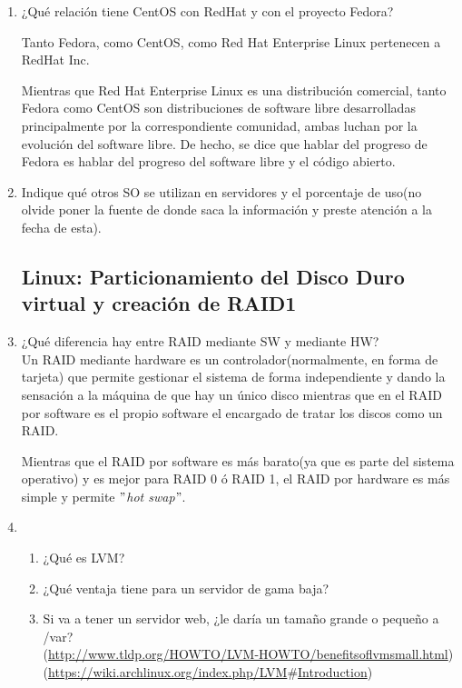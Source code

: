 \documentclass[paper=a4, fontsize=11pt]{scrartcl} %
\numberwithin{equation}{section} %
\numberwithin{figure}{section} %
\numberwithin{table}{section} %
\begin{document}
\begin{enumerate}
		\item ¿Qué relación tiene CentOS con RedHat y con el proyecto Fedora?
		
		Tanto Fedora\cite{Fedora}, como CentOS\cite{CentOS}, como Red Hat Enterprise Linux\cite{RedHat}
		pertenecen a RedHat Inc.
		
		Mientras que Red Hat Enterprise Linux es una distribución comercial, tanto Fedora como CentOS
		son distribuciones de software libre desarrolladas principalmente por la correspondiente
		comunidad, ambas luchan por la evolución del software libre. De hecho, se dice que hablar del
		progreso de Fedora es hablar del progreso del software libre y el código abierto\cite{cita}.
		
		
		\item Indique qué otros SO se utilizan en servidores y el porcentaje de uso(no olvide poner
		la fuente de donde saca la información y preste atención a la fecha de esta).
		
	\subsection{Linux: Particionamiento del Disco Duro virtual y creación de RAID1}
		\item ¿Qué diferencia hay entre RAID mediante SW y mediante HW?\\
		Un RAID mediante hardware es un controlador(normalmente, en forma de tarjeta) que permite gestionar
		el sistema de forma independiente y dando la sensación a la máquina de que hay un único disco mientras
		que en el RAID por software es el propio software el encargado de tratar los discos como un RAID.
		
		Mientras que el RAID por software es más barato(ya que es parte del sistema operativo) y es mejor
		para RAID 0 ó RAID 1, el RAID por hardware es más simple y permite \textit{$"$hot swap$"$}.
		\cite{HWvsSW}\cite{RAID_RedHat}
		
		
		\item \begin{enumerate}
			\item ¿Qué es LVM?
			
			\item ¿Qué ventaja tiene para un servidor de gama baja?
			
			\item Si va a tener un servidor web, ¿le daría un tamaño grande o pequeño a /var?\\
			(\href{http://www.tldp.org/HOWTO/LVM-HOWTO/benefitsoflvmsmall.html}
			{http://www.tldp.org/HOWTO/LVM-HOWTO/benefitsoflvmsmall.html})
			(\href{https://wiki.archlinux.org/index.php/LVM#Introduction}
			{https://wiki.archlinux.org/index.php/LVM$\#$Introduction})\\
		\end{enumerate}
		

\end{enumerate}
\end{document}

